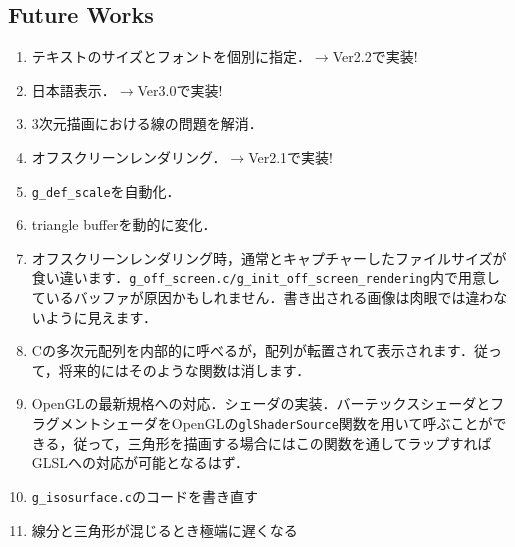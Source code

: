 \documentclass[platex,a4paper,12pt]{jsarticle}%
\begin{document}
\subsection{Future Works}
\begin{enumerate}
\item テキストのサイズとフォントを個別に指定．$\rightarrow$Ver2.2で実装!
\item 日本語表示．$\rightarrow$Ver3.0で実装!
\item 3次元描画における線の問題を解消．
\item オフスクリーンレンダリング．$\rightarrow$Ver2.1で実装!
\item \verb|g_def_scale|を自動化．
\item triangle bufferを動的に変化．
\item オフスクリーンレンダリング時，通常とキャプチャーしたファイルサイズが食い違います．\verb|g_off_screen.c/g_init_off_screen_rendering|内で用意しているバッファが原因かもしれません．書き出される画像は肉眼では違わないように見えます．
\item Cの多次元配列を内部的に呼べるが，配列が転置されて表示されます．従って，将来的にはそのような関数は消します．
\item OpenGLの最新規格への対応．シェーダの実装．バーテックスシェーダとフラグメントシェーダをOpenGLの\verb|glShaderSource|関数を用いて呼ぶことができる，従って，三角形を描画する場合にはこの関数を通してラップすればGLSLへの対応が可能となるはず．
\item \verb|g_isosurface.c|のコードを書き直す
\item 線分と三角形が混じるとき極端に遅くなる
\end{enumerate}
\end{document}
